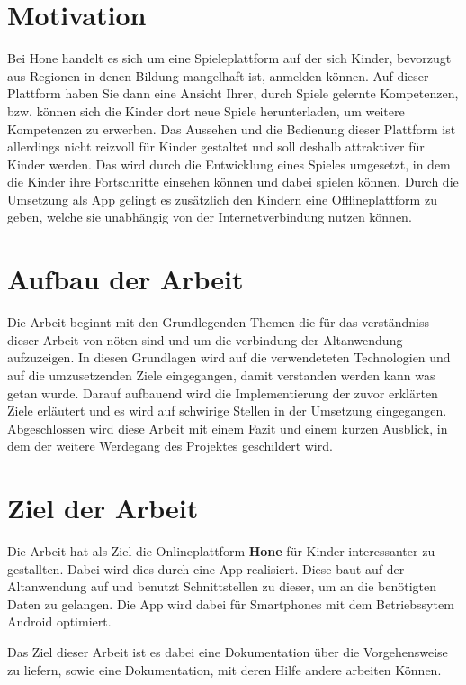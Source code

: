 \section{Motivation}
Bei Hone handelt es sich um eine Spieleplattform auf der sich Kinder, bevorzugt aus Regionen in denen Bildung mangelhaft ist, anmelden können. Auf dieser Plattform haben Sie dann eine Ansicht Ihrer, durch Spiele gelernte Kompetenzen, bzw. können sich die Kinder dort neue Spiele herunterladen, um weitere Kompetenzen zu erwerben. Das Aussehen und die Bedienung dieser Plattform ist allerdings nicht reizvoll für Kinder gestaltet und soll deshalb attraktiver für Kinder werden. Das wird durch die Entwicklung eines Spieles umgesetzt, in dem die Kinder ihre Fortschritte einsehen können und dabei spielen können. Durch die Umsetzung als App gelingt es zusätzlich den Kindern eine Offlineplattform zu geben, welche sie unabhängig von der Internetverbindung nutzen können. 

\section{Aufbau der Arbeit}

Die Arbeit beginnt mit den Grundlegenden Themen die für das verständniss dieser Arbeit von nöten sind und um die verbindung der Altanwendung aufzuzeigen. In diesen Grundlagen wird auf die verwendeteten Technologien und auf die umzusetzenden Ziele eingegangen, damit verstanden werden kann was getan wurde. Darauf aufbauend wird die Implementierung der zuvor erklärten Ziele erläutert und es wird auf schwirige Stellen in der Umsetzung eingegangen. Abgeschlossen wird diese Arbeit mit einem Fazit und einem kurzen Ausblick, in dem der weitere Werdegang des Projektes geschildert wird.

\section{Ziel der Arbeit}

Die Arbeit hat als Ziel die Onlineplattform \textbf{Hone} für Kinder interessanter zu gestallten. Dabei wird dies durch eine App realisiert. Diese baut auf der Altanwendung auf und benutzt Schnittstellen zu dieser, um an die benötigten Daten zu gelangen. Die App wird dabei für Smartphones mit dem Betriebssytem Android optimiert.

Das Ziel dieser Arbeit ist es dabei eine Dokumentation über die Vorgehensweise zu liefern, sowie eine Dokumentation, mit deren Hilfe andere arbeiten Können.